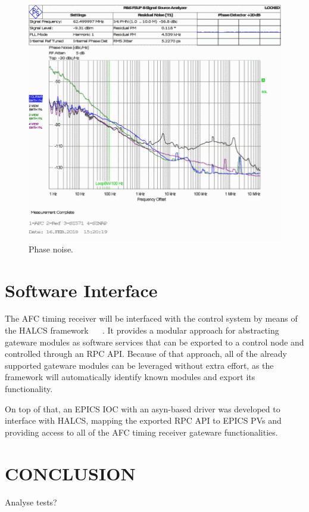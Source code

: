 \documentclass[a4paper,
               biblatex,      %
               ]{jacow}
\begin{document}
\begin{figure}[!htb]
   \centering
   \includegraphics*[width=0.8\columnwidth]{AFC_TIMING_SI571}
   \caption{Phase noise.}
   \label{fig:AFCPhaseNoise}
\end{figure}

\section{Software Interface}
The AFC timing receiver will be interfaced with the control system by means of the HALCS framework ~\cite{halcs_pcapac16} ~\cite{halcs_icalepcs17}. It provides a modular approach for abstracting gateware modules as software services that can be exported to a control node and controlled through an RPC API. Because of that approach, all of the already supported gateware modules can be leveraged without extra effort, as the framework will automatically identify known modules and export its functionality.

On top of that, an EPICS IOC with an asyn-based driver was developed to interface with HALCS, mapping the exported RPC API to EPICS PVs and providing access to all of the AFC timing receiver gateware functionalities.

\section{CONCLUSION}

Analyse tests?

\printbibliography
\newpage
\end{document}
